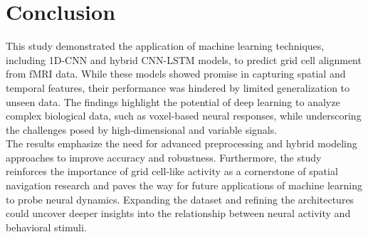 \documentclass[a4paper]{article}
\begin{document}
\section{Conclusion}
\label{sec:conclusion}

\noindent This study demonstrated the application of machine learning techniques, including 1D-CNN and hybrid CNN-LSTM models, to predict grid cell alignment from fMRI data. While these models showed promise in capturing spatial and temporal features, their performance was hindered by limited generalization to unseen data. The findings highlight the potential of deep learning to analyze complex biological data, such as voxel-based neural responses, while underscoring the challenges posed by high-dimensional and variable signals.\\

\noindent The results emphasize the need for advanced preprocessing and hybrid modeling approaches to improve accuracy and robustness. Furthermore, the study reinforces the importance of grid cell-like activity as a cornerstone of spatial navigation research and paves the way for future applications of machine learning to probe neural dynamics. Expanding the dataset and refining the architectures could uncover deeper insights into the relationship between neural activity and behavioral stimuli.

    
\newpage
\printbibliography[heading=bibintoc, title={References}]
\end{document}
